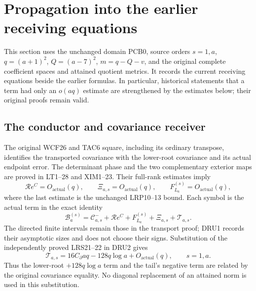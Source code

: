 
\begingroup
\section{Propagation into the earlier receiving equations}
\label{sec:DRU}

This section uses the unchanged domain PCB0, source orders $s=1,a$,
$q=(a+1)^2$, $Q=(a-7)^2$, $m=q-Q-v$, and the original complete
coefficient spaces and attained quotient metrics.  It records the
current receiving equations beside the earlier formulas.  In particular,
historical statements that a term had only an $o(aq)$ estimate are
strengthened by the estimates below; their original proofs remain valid.

\subsection{The conductor and covariance receiver}
The original WCF26 and TAC6 square, including its ordinary transpose,
identifies the transported covariance with the lower-root covariance
and its actual endpoint error.  The determinant phase and the two
complementary exterior maps are proved in LT1--28 and XIM1--23.
Their full-rank estimates imply
\[
 \mathcal R e^C=O_{\mathrm{actual}}(q),\qquad
 \Xi_{a,s}=O_{\mathrm{actual}}(q),\qquad
 F_{L_a}^{(s)}=O_{\mathrm{actual}}(q),
 \tag{DRU1}
\]
where the last estimate is the unchanged LRP10--13 bound.  Each symbol
is the actual term in the exact identity
\[
 \mathcal B_a^{(s)}=
 \mathcal C^-_{a,s}+\mathcal R e^C+
 F_{L_a}^{(s)}+\Xi_{a,s}+\mathcal T_{a,s}.
 \tag{DRU2}
\]
The directed finite intervals remain those in the transport proof;
DRU1 records their asymptotic sizes and does not choose their signs.
Substitution of the independently proved LRS21--22 in DRU2 gives
\[
 \mathcal T_{a,s}
 =16C_\partial aq-128q\log a+O_{\mathrm{actual}}(q),
 \qquad s=1,a.
 \tag{DRU3}
\]
Thus the lower-root $+128q\log a$ term and the tail's negative term
are related by the original covariance equality.  No diagonal
replacement of an attained norm is used in this substitution.

